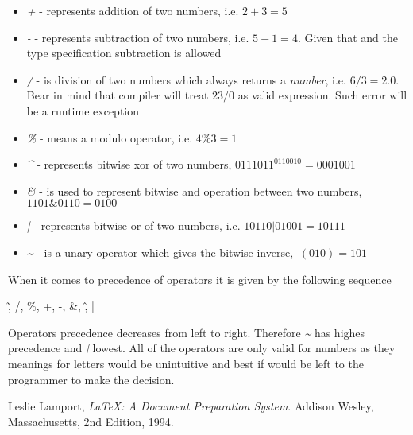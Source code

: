 \documentclass[a4wide, 11pt]{article}
\begin{document}
\begin{itemize}

    \item
    \textit{+} - represents addition of two numbers, i.e. $ 2 + 3 = 5 $

    \item
    \textit{-} - represents subtraction of two numbers, i.e. $ 5 - 1 = 4 $. Given that and the type specification subtraction is allowed 

    \item
    \textit{/} - is division of two numbers which always returns a \emph{number}, i.e. $ 6 / 3 = 2.0 $. Bear in mind that compiler will treat $ 23 / 0 $ as valid expression. Such error will be a runtime exception

    \item
    \textit{\%} - means a modulo operator, i.e. $ 4 \% 3 = 1 $

    \item
    \textit{\^} - represents bitwise xor of two numbers, $ 0111011 ^ 0110010 = 0001001 $

    \item
    \textit{\&} - is used to represent bitwise and operation between two numbers,  $ 1101 \& 0110 = 0100 $

    \item
    \textit{|} - represents bitwise or of two numbers, i.e. $ 10110 | 01001 = 10111 $

    \item
    \textit{\~} - is a unary operator which gives the bitwise inverse, $ ~(010) = 101 $
    
\end{itemize}

When it comes to precedence of operators it is given by the following sequence

\begin{center} \~, /, \%, +, -, \&, \^, | \end{center}

Operators precedence decreases from left to right. Therefore \emph{\~} has highes precedence and \emph{|} lowest.
All of the operators are only valid for numbers as they meanings for letters would be unintuitive and best if would be left to the programmer to make the decision.


\begin{thebibliography}{9}

  Leslie Lamport,
  \emph{\LaTeX: A Document Preparation System}.
  Addison Wesley, Massachusetts,
  2nd Edition,
  1994.

\end{thebibliography}
\end{document}

